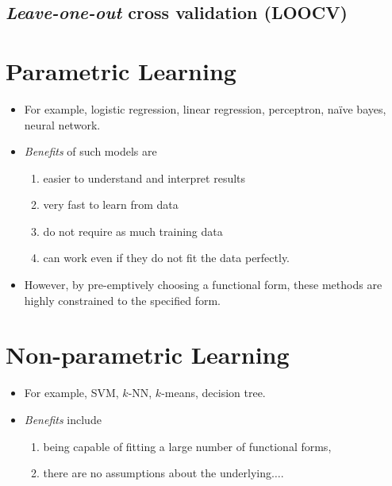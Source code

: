 \documentclass[
	number={1},
	title={Machine Learning Fundamentals}
]{cs584notes}
\begin{document}
\subsection{\emph{Leave-one-out} cross validation (LOOCV)}\label{subsec:loocv}

\section{Parametric Learning}\label{sec:parametric-learning}
\begin{itemize}
	\item For example, logistic regression, linear regression, perceptron, na\"ive bayes, neural network.
	\item \emph{Benefits} of such models are
	\begin{enumerate}[label=(\alph*)]
		\item easier to understand and interpret results
		\item very fast to learn from data
		\item do not require as much training data
		\item can work even if they do not fit the data perfectly.
	\end{enumerate}
	\item However, by pre-emptively choosing a functional form, these methods are highly constrained to the specified form.
\end{itemize}

\section{Non-parametric Learning}\label{sec:non-parametric-learning}

\begin{itemize}
	\item For example, SVM, $k$-NN, $k$-means, decision tree.
	\item \emph{Benefits} include
	\begin{enumerate}[label=(\alph*)]
		\item being capable of fitting a large number of functional forms,
		\item there are no assumptions about the underlying$\dots$.
	\end{enumerate}
\end{itemize}
\end{document}
